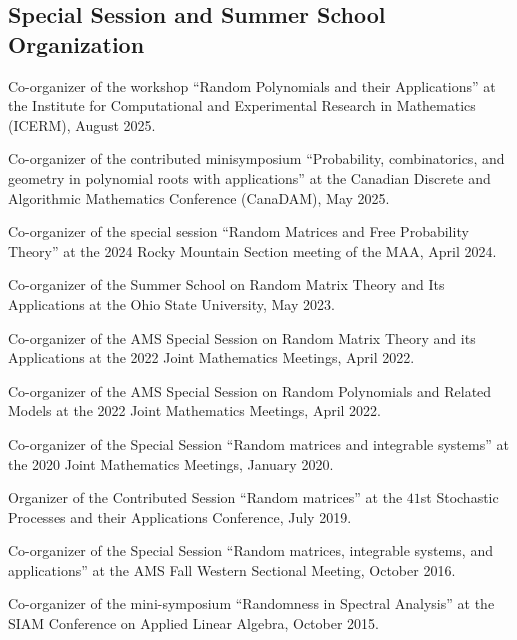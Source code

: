 \documentclass[letterpaper]{article}
\renewenvironment{itemize}{
  \begin{list}{}{
    \setlength{\leftmargin}{1em}
  }
}{
  \end{list}
}
\begin{document}
\subsection*{Special Session and Summer School Organization}
\begin{itemize}
	\item Co-organizer of the workshop ``Random Polynomials and their Applications'' at the Institute for Computational and Experimental Research in Mathematics (ICERM), August 2025. 
	\item Co-organizer of the contributed minisymposium ``Probability, combinatorics, and geometry in polynomial roots with applications'' at the Canadian Discrete and Algorithmic Mathematics Conference (CanaDAM), May 2025. 
	\item Co-organizer of the special session ``Random Matrices and Free Probability Theory'' at the 2024 Rocky Mountain Section meeting of the MAA, April 2024. 
	\item Co-organizer of the Summer School on Random Matrix Theory and Its Applications at the Ohio State University, May 2023. 
	\item Co-organizer of the AMS Special Session on Random Matrix Theory and its Applications at the 2022 Joint Mathematics Meetings, April 2022.
	\item Co-organizer of the AMS Special Session on Random Polynomials and Related Models at the 2022 Joint Mathematics Meetings, April 2022. 
	\item Co-organizer of the Special Session ``Random matrices and integrable systems'' at the 2020 Joint Mathematics Meetings, January 2020.  
	\item Organizer of the Contributed Session ``Random matrices'' at the $41$st Stochastic Processes and their Applications Conference, July 2019.
	\item Co-organizer of the Special Session ``Random matrices, integrable systems, and applications'' at the AMS Fall Western Sectional Meeting, October 2016.
	\item Co-organizer of the mini-symposium ``Randomness in Spectral Analysis'' at the SIAM Conference on Applied Linear Algebra, October 2015.
\end{itemize}
\end{document}
